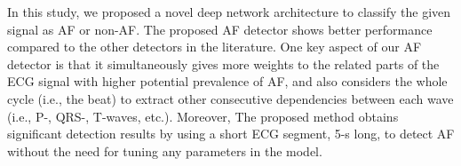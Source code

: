 \documentclass[conference]{IEEEtran}
\begin{document}
In this study, we proposed a novel deep network architecture to classify the given signal as AF or non-AF. The proposed AF detector shows better performance compared to the other detectors in the literature. One key aspect of our AF detector is that it simultaneously gives more weights to the related parts of the ECG signal with higher potential prevalence of AF, and also considers the whole cycle (i.e., the beat) to extract other consecutive dependencies between each wave (i.e., P-, QRS-, T-waves, etc.). Moreover, The proposed method obtains significant detection results by using a short ECG segment, 5-s long, to detect AF without the need for tuning any parameters in the model. 











\end{document}

